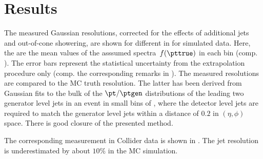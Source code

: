 \section{Results}\label{sec:ResFit:Results}

The measured Gaussian resolutions, corrected for the effects of
additional jets and out-of-cone showering, are shown for different
\ptref in  for simulated
data.
Here, the \ptref are the mean values of the asssumed spectra~$f(\pttrue)$
in each \ptave bin (comp. ).
The error bars represent the statistical uncertainty from the
extrapolation procedure only (comp. the corresponding remarks in
).
The measured resolutions are compared to the MC truth resolution.
The latter has been derived from Gaussian fits to the bulk of the
\mbox{$\pt / \ptgen$} distributions of the leading two generator
level jets in an event in small bins of \ptgen, where the
detector level jets are required to match the generator level jets
within a distance of $0.2$ in \mbox{$(\eta,\phi)$} space.
There is good closure of the presented method.

The corresponding measurement in Collider data is shown in .
The jet \pt resolution is underestimated by about $10\%$ in the MC simulation.

